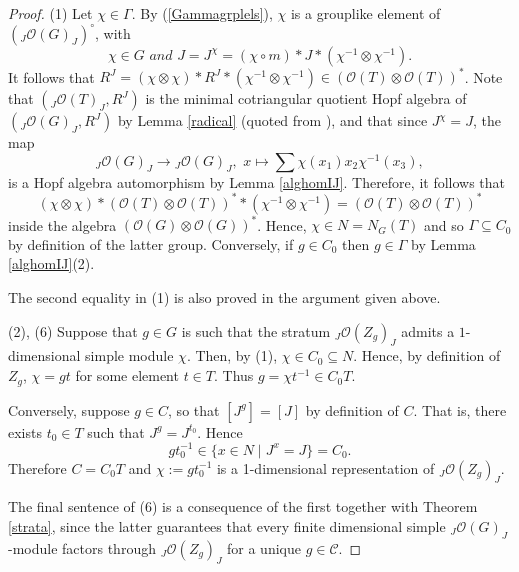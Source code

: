 \documentclass{amsart}
\numberwithin{equation}{section}
\theoremstyle{definition}
\begin{document}
\begin{proof} 
(1) Let $\chi \in \Gamma$. By (\ref{Gammagrplels}), $\chi$ is a grouplike element of $\left({}_J\mathcal{O}(G)_J\right)^{\circ}$, with 
\begin{equation}\label{preprevious}
\chi \in G \textit{  and  } J=J^{\chi}=(\chi\circ m)*J*(\chi^{-1}\otimes \chi^{-1}).
\end{equation}
It follows that 
$R^J=(\chi\otimes \chi)*R^J*(\chi^{-1}\otimes \chi^{-1})\in \left(\mathcal{O}(T)\otimes \mathcal{O}(T)\right)^*$. Note that $\left({}_J\mathcal{O}(T)_J,R^J\right)$ is the minimal cotriangular quotient Hopf algebra of $\left({}_J\mathcal{O}(G)_J,R^J\right)$ by Lemma \ref{radical} (quoted from \cite[Section 2.2]{G1}), and that since $J^{\chi}=J$, the map
$${}_J\mathcal{O}(G)_J\to {}_J\mathcal{O}(G)_J,\,\,x\mapsto 
\sum \chi(x_1)x_2\chi^{-1}(x_3),$$
is a Hopf algebra automorphism by Lemma \ref{alghomIJ}. Therefore, it follows that 
\begin{equation}\label{addon}
(\chi\otimes \chi)*\left(\mathcal{O}(T)\otimes \mathcal{O}(T)\right)^* *(\chi^{-1}\otimes \chi^{-1})=\left(\mathcal{O}(T)\otimes \mathcal{O}(T)\right)^*
\end{equation}
inside the algebra $\left(\mathcal{O}(G)\otimes \mathcal{O}(G)\right)^*$. Hence, $\chi \in N = N_G(T)$ and so $\Gamma \subseteq C_0$ by definition of the latter group. Conversely, if $g \in C_0$ then $g \in \Gamma$ by Lemma \ref{alghomIJ}(2).

The second equality in (1) is also proved in the argument given above.

(2), (6) Suppose that $g \in G$ is such that the stratum ${}_J\mathcal{O}(Z_g)_J$ admits a $1$-dimensional simple module $\chi$. Then, by (1),  $\chi \in C_0 \subseteq N$. Hence, by definition of $Z_g$, $\chi = gt$ for some element $t \in T$. Thus $g = \chi t^{-1} \in C_0 T$. 

Conversely, suppose $g \in C$, so that $[J^g] = [J]$ by definition of $C$. That is, there exists $t_0 \in T$ such that $J^g = J^{t_0}$. Hence
$$ gt_0^{-1} \in \{ x \in N \mid J^x = J \} = C_0.$$
Therefore $C = C_0 T$ and $\chi := gt_0^{-1}$ is a 1-dimensional representation of ${}_J\mathcal{O}(Z_g)_J$. 

The final sentence of (6) is a consequence of the first together with Theorem \ref{strata}, since the latter guarantees that every finite dimensional simple ${}_J\mathcal{O}(G)_J$-module factors through ${}_J\mathcal{O}(Z_g)_J$ for a unique $g\in \mathcal{C}$.


\end{proof}
\end{document}
